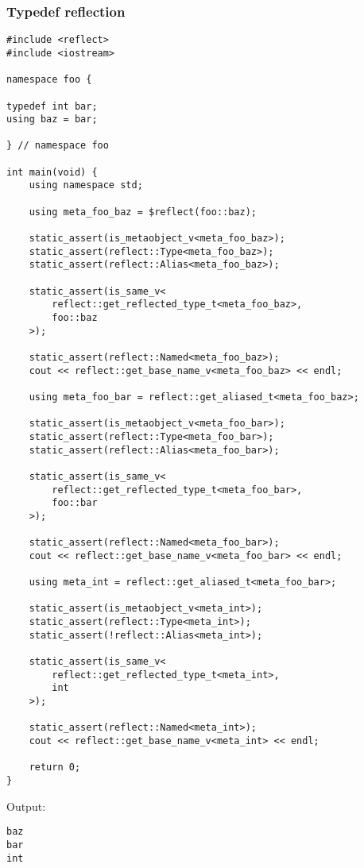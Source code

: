 \subsubsection{Typedef reflection}

\begin{verbatim}
#include <reflect>
#include <iostream>

namespace foo {

typedef int bar;
using baz = bar;

} // namespace foo

int main(void) {
	using namespace std;

	using meta_foo_baz = $reflect(foo::baz);

	static_assert(is_metaobject_v<meta_foo_baz>);
	static_assert(reflect::Type<meta_foo_baz>);
	static_assert(reflect::Alias<meta_foo_baz>);

	static_assert(is_same_v<
		reflect::get_reflected_type_t<meta_foo_baz>,
		foo::baz
	>);

	static_assert(reflect::Named<meta_foo_baz>);
	cout << reflect::get_base_name_v<meta_foo_baz> << endl;

	using meta_foo_bar = reflect::get_aliased_t<meta_foo_baz>;

	static_assert(is_metaobject_v<meta_foo_bar>);
	static_assert(reflect::Type<meta_foo_bar>);
	static_assert(reflect::Alias<meta_foo_bar>);

	static_assert(is_same_v<
		reflect::get_reflected_type_t<meta_foo_bar>,
		foo::bar
	>);

	static_assert(reflect::Named<meta_foo_bar>);
	cout << reflect::get_base_name_v<meta_foo_bar> << endl;

	using meta_int = reflect::get_aliased_t<meta_foo_bar>;

	static_assert(is_metaobject_v<meta_int>);
	static_assert(reflect::Type<meta_int>);
	static_assert(!reflect::Alias<meta_int>);

	static_assert(is_same_v<
		reflect::get_reflected_type_t<meta_int>,
		int
	>);

	static_assert(reflect::Named<meta_int>);
	cout << reflect::get_base_name_v<meta_int> << endl;

	return 0;
}

\end{verbatim}

Output:

\begin{verbatim}
baz
bar
int
\end{verbatim}

